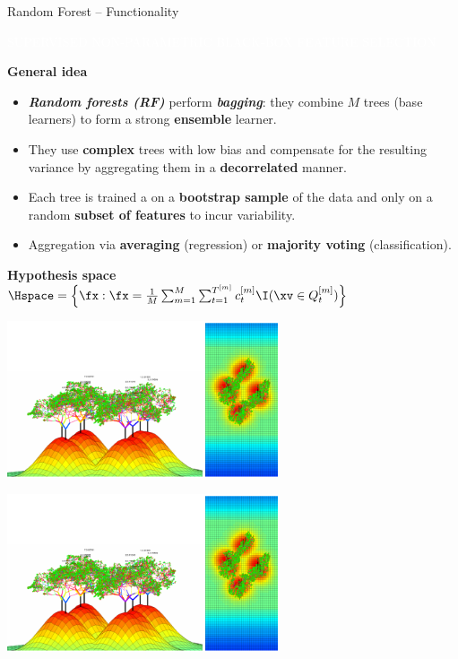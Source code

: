 \documentclass[11pt,compress,t,notes=noshow, xcolor=table]{beamer}
\newcommand{\bfit}[1]{\textbf{\textit{#1}}}
\newcommand{\maketag}[1]{\colorbox{highlightcol}{\textcolor{white}
{\MakeUppercase{#1}}}}
\newcommand{\highlight}[1]{\textcolor{highlightcol}{\textbf{#1}}}
\begin{document}
\begin{frame}{Random Forest -- Functionality}

\footnotesize

\maketag{SUPERVISED}
\maketag{NON-PARAMETRIC}
\maketag{BLACK-BOX}
\maketag{FEATURE SELECTION}

\medskip

\highlight{General idea} 
\begin{itemize}
  \item \bfit{Random forests (RF)} perform \bfit{bagging}: they combine 
  $M$ trees (base learners) to form a strong \textbf{ensemble} learner. 
  \item They use \textbf{complex} trees with low  bias and compensate for the
  resulting variance by aggregating them in a \textbf{decorrelated} manner. 
  \item Each tree is trained a on a \textbf{bootstrap sample} of the data and 
  only on a random \textbf{subset of features} to incur variability.
  \item Aggregation via \textbf{averaging} (regression) or 
  \textbf{majority voting} (classification).
\end{itemize}

\medskip

\highlight{Hypothesis space} ~~
$\Hspace = \left\{ \fx: \fx = \frac{1}{M} \sum_{m = 1}^M \sum_{t = 1}^{T^{[m]}} 
c_t^{[m]} \I(\xv \in Q_t^{[m]}) \right\}$

\begin{minipage}{0.5\textwidth}
  \includegraphics[width=0.6\textwidth]{figure/rf_3d.PNG}
\end{minipage}%
\begin{minipage}{0.5\textwidth}
  \includegraphics[width=0.6\textwidth]{figure/rf_3d.PNG}
\end{minipage}

\end{frame}
\end{document}

